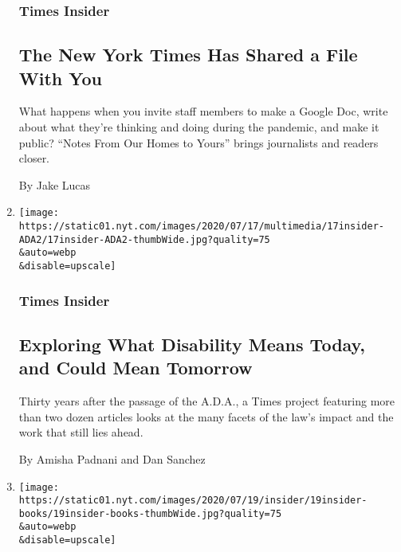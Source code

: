 \begin{enumerate}
  \hypertarget{times-insider-5}{%
  \subsubsection{Times Insider}\label{times-insider-5}}

  \hypertarget{the-new-york-times-has-shared-a-file-with-you}{%
  \subsection{The New York Times Has Shared a File With
  You}\label{the-new-york-times-has-shared-a-file-with-you}}

  What happens when you invite staff members to make a Google Doc, write
  about what they're thinking and doing during the pandemic, and make it
  public? ``Notes From Our Homes to Yours'' brings journalists and
  readers closer.

  By Jake Lucas
\item
  \href{/2020/07/20/insider/disability-ADA.html}{}

  \texttt{[image: https://static01.nyt.com/images/2020/07/17/multimedia/17insider-ADA2/17insider-ADA2-thumbWide.jpg?quality=75\\\&auto=webp\\\&disable=upscale]}

  \hypertarget{times-insider-6}{%
  \subsubsection{Times Insider}\label{times-insider-6}}

  \hypertarget{exploring-what-disability-means-today-and-could-mean-tomorrow}{%
  \subsection{Exploring What Disability Means Today, and Could Mean
  Tomorrow}\label{exploring-what-disability-means-today-and-could-mean-tomorrow}}

  Thirty years after the passage of the A.D.A., a Times project
  featuring more than two dozen articles looks at the many facets of the
  law's impact and the work that still lies ahead.

  By Amisha Padnani and Dan Sanchez
\item
  \href{/2020/07/19/insider/times-book-review-remote.html}{}

  \texttt{[image: https://static01.nyt.com/images/2020/07/19/insider/19insider-books/19insider-books-thumbWide.jpg?quality=75\\\&auto=webp\\\&disable=upscale]}


\end{enumerate}
